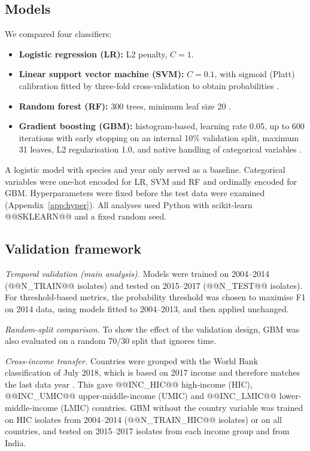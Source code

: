 \documentclass[11pt,a4paper]{article}
\begin{document}
\subsection{Models}
We compared four classifiers:
\begin{itemize}
\item \textbf{Logistic regression (LR):} L2 penalty, $C=1$.
\item \textbf{Linear support vector machine (SVM):} $C=0.1$, with sigmoid (Platt) calibration fitted by three-fold cross-validation to obtain probabilities \cite{platt1999}.
\item \textbf{Random forest (RF):} 300 trees, minimum leaf size 20 \cite{breiman2001}.
\item \textbf{Gradient boosting (GBM):} histogram-based, learning rate 0.05, up to 600 iterations with early stopping on an internal 10\% validation split, maximum 31 leaves, L2 regularisation 1.0, and native handling of categorical variables \cite{ke2017}.
\end{itemize}
A logistic model with species and year only served as a baseline. Categorical variables were one-hot encoded for LR, SVM and RF and ordinally encoded for GBM. Hyperparameters were fixed before the test data were examined (Appendix~\ref{app:hyper}). All analyses used Python with scikit-learn @@SKLEARN@@ \cite{pedregosa2011} and a fixed random seed.

\subsection{Validation framework}
\textit{Temporal validation (main analysis).} Models were trained on 2004--2014 (@@N_TRAIN@@ isolates) and tested on 2015--2017 (@@N_TEST@@ isolates). For threshold-based metrics, the probability threshold was chosen to maximise F1 on 2014 data, using models fitted to 2004--2013, and then applied unchanged.

\textit{Random-split comparison.} To show the effect of the validation design, GBM was also evaluated on a random 70/30 split that ignores time.

\textit{Cross-income transfer.} Countries were grouped with the World Bank classification of July 2018, which is based on 2017 income and therefore matches the last data year \cite{worldbank2018}. This gave @@INC_HIC@@ high-income (HIC), @@INC_UMIC@@ upper-middle-income (UMIC) and @@INC_LMIC@@ lower-middle-income (LMIC) countries. GBM without the country variable was trained on HIC isolates from 2004--2014 (@@N_TRAIN_HIC@@ isolates) or on all countries, and tested on 2015--2017 isolates from each income group and from India.
\end{document}
